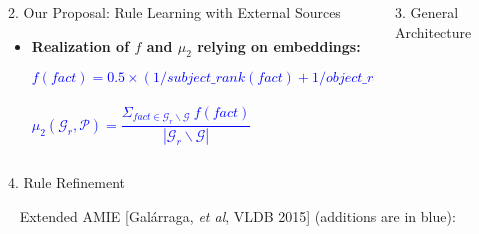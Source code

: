 \documentclass[t,final,hyperref={pdfpagelabels=true}]{beamer}
\def\cG{\ensuremath{\mathcal{G}}}
\newcommand{\bl}[1]{\textcolor{blue}{#1}}
\begin{document}
\begin{frame}
\begin{columns}[t]
\begin{column}{.5\textwidth}
\begin{block}{2. Our Proposal: Rule Learning with External Sources}
\begin{itemize}
\begin{itemize}
						\end{itemize}	

\bigskip
\bigskip

\item \normalsize{\textbf{Realization of $f$ and $\mu_2$ relying on embeddings:}}\vspace{-.7cm}
\small{\begin{center}	\bl{\[f(fact)=0.5\times (1/subject\_rank(fact)+1/object\_rank(fact))\]}\\
\bl{$\mu_2(\cG_r,\mathcal{P}) = \dfrac{\Sigma_{fact\in \cG_r\backslash \cG}\ f(fact)}{ |\cG_r \backslash \cG|}$}
\end{center}}

\end{itemize}
			\end{block}
			\vspace{-1.5cm}

		\end{column}
				
				
		\begin{column}{.5\textwidth}
	
			\begin{block}{3. General Architecture}
\bigskip
\bigskip


			\end{block}
		\end{column}
	\end{columns}

	\begin{columns}[t]
		\begin{column}{.5\textwidth}
\vspace{-.4cm}
			\begin{block}{4. Rule Refinement}	
\bigskip

$\,\,\,$ \small{Extended AMIE [Gal{\'{a}}rraga, \emph{et al}, VLDB 2015] (additions are in blue)}:			
\bigskip
\bigskip
\bigskip


\end{block}
\end{column}
\end{columns}
\end{frame}
\end{document}
